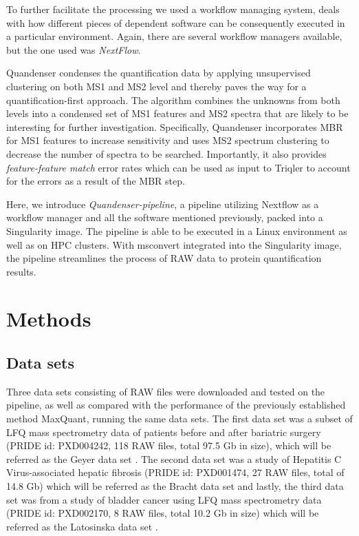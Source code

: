 \documentclass[11pt]{article}
\begin{document}
To further facilitate the processing we used a workflow managing system, deals with how different pieces of dependent software can be consequently executed in a particular environment. Again, there are several workflow managers available, but the one used was \textit{NextFlow}\cite{di2017nextflow}.

Quandenser condenses the quantification data by applying unsupervised clustering on both MS1 and MS2 level and thereby paves the way for a quantification-first approach. The algorithm combines the unknowns from both levels into a condensed set of MS1 features and MS2 spectra that are likely to be interesting for further investigation. Specifically, Quandenser incorporates MBR for MS1 features to increase sensitivity and uses MS2 spectrum clustering to decrease the number of spectra to be searched. Importantly, it also provides {\em feature-feature match} error rates which can be used as input to Triqler to account for the errors as a result of the MBR step.

Here, we introduce \textit{Quandenser-pipeline}, a pipeline utilizing Nextflow as a workflow manager and all the software mentioned previously, packed into a Singularity image. The pipeline is able to be executed in a Linux environment as well as on HPC clusters. With msconvert integrated into the Singularity image, the pipeline streamlines the process of RAW data to protein quantification results.

\section*{Methods}

\subsection*{Data sets}
Three data sets consisting of RAW files were downloaded and tested on the pipeline, as well as compared with the performance of the previously established method MaxQuant, running the same data sets. The first data set was a subset of LFQ mass spectrometry data of patients before and after bariatric surgery (PRIDE id: PXD004242, 118 RAW files, total 97.5 Gb in size), which will be referred as the Geyer data set \cite{geyer2016bartric}. The second data set was a study of Hepatitis C Virus-associated hepatic fibrosis (PRIDE id: PXD001474, 27 RAW files, total of 14.8 Gb) which will be referred as the Bracht data set and lastly, the third data set was from a study of bladder cancer using LFQ mass spectrometry data (PRIDE id: PXD002170, 8 RAW files, total 10.2 Gb in size) which will be referred as the Latosinska data set \cite{bracht2015analysis} \cite{latosinska2015comparative}.
\end{document}
